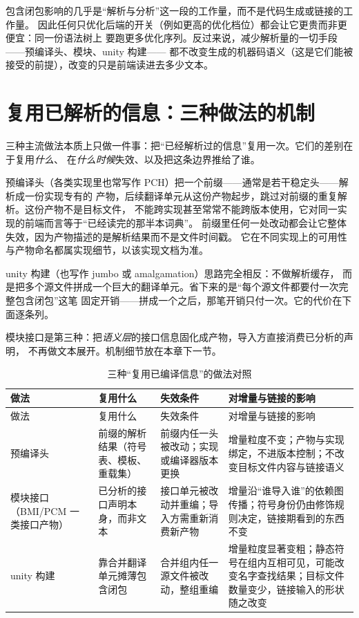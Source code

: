 \documentclass[12pt,a4paper,fontset=fandol]{ctexbook}
\newcommand{\Mx}[1]{\textsf{#1}}
\begin{document}
\begin{note}[title={成本落在哪一段，决定用哪种办法省}]
包含闭包影响的几乎是“解析与分析”这一段的工作量，而不是代码生成或链接的工作量。
因此任何只优化后端的开关（例如更高的优化档位）都会让它更贵而非更便宜：同一份语法树上
要跑更多优化序列。反过来说，减少解析量的一切手段——预编译头、模块、unity 构建——
都不改变生成的机器码语义（这是它们能被接受的前提），改变的只是前端读进去多少文本。
\end{note}

\section{复用已解析的信息：三种做法的机制}\label{sec:cl02-reuse}

三种主流做法本质上只做一件事：把“已经解析过的信息”复用一次。它们的差别在于复用\emph{什么}、
在\emph{什么时候}失效、以及把这条边界推给了谁。

预编译头（各类实现里也常写作 \Mx{PCH}）把一个前缀——通常是若干稳定头——解析成一份实现专有的
产物，后续翻译单元从这份产物起步，跳过对前缀的重复解析。这份产物不是目标文件，
不能跨实现甚至常常不能跨版本使用，它对同一实现的前端而言等于“已经读完的那半本词典”。
前缀里任何一处改动都会让它整体失效，因为产物描述的是解析结果而不是文件时间戳。
它在不同实现上的可用性与产物命名都属实现细节，以该实现文档为准。

unity 构建（也写作 \Mx{jumbo} 或 \Mx{amalgamation}）思路完全相反：不做解析缓存，
而是把多个源文件拼成一个巨大的翻译单元。省下来的是“每个源文件都要付一次完整包含闭包”这笔
固定开销——拼成一个之后，那笔开销只付一次。它的代价在下面逐条列。

模块接口是第三种：把\emph{语义层}的接口信息固化成产物，导入方直接消费已分析的声明，
不再做文本展开。机制细节放在本章下一节。

\begin{longtable}{@{}>{\raggedright\arraybackslash}p{} >{\raggedright\arraybackslash}p{} >{\raggedright\arraybackslash}p{} >{\raggedright\arraybackslash}p{}@{}}
\caption{三种“复用已编译信息”的做法对照}\label{tab:cl02-reuse}\\
\toprule
做法 & 复用什么 & 失效条件 & 对增量与链接的影响 \\
\midrule
\endfirsthead
\toprule
做法 & 复用什么 & 失效条件 & 对增量与链接的影响 \\
\midrule
\endhead
\bottomrule
\endfoot
预编译头 & 前缀的解析结果（符号表、模板、重载集） & 前缀内任一头被改动；实现或编译器版本更换 & 增量粒度不变；产物与实现绑定，不进版本控制；不改变目标文件内容与链接语义 \\
模块接口（BMI/PCM 一类接口产物） & 已分析的接口声明本身，而非文本 & 接口单元被改动并重编；导入方需重新消费新产物 & 增量沿“谁导入谁”的依赖图传播；符号身份仍由修饰规则决定，链接期看到的东西不变 \\
unity 构建 & 靠合并翻译单元摊薄包含闭包 & 合并组内任一源文件被改动，整组重编 & 增量粒度显著变粗；静态符号在组内互相可见，可能改变名字查找结果；目标文件数量变少，链接输入的形状随之改变 \\
\end{longtable}
\end{document}
